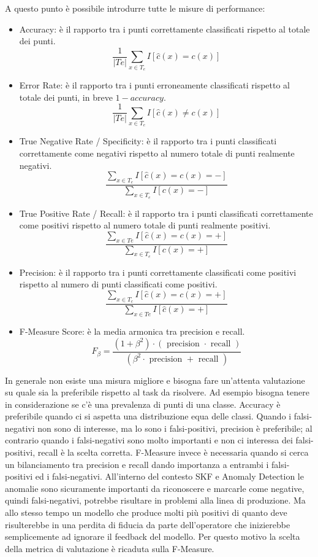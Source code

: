 A questo punto è possibile introdurre tutte le misure di performance:
\begin{itemize}
\item Accuracy: è il rapporto tra i punti correttamente classificati rispetto al totale dei punti.
\[\frac{1}{|Te|} \sum_{x \in T_e} I[\hat{c}(x)=c(x)]\]
\item Error Rate: è il rapporto tra i punti erroneamente classificati rispetto al totale dei punti, in breve \(1-accuracy\).
\[\frac{1}{|Te|} \sum_{x \in T_e} I[\hat{c}(x)\neq c(x)]\]
\item True Negative Rate / Specificity: è il rapporto tra i punti classificati correttamente come negativi rispetto al numero totale di punti realmente negativi.
\[\frac{\sum_{x \in T_e} I[\hat{c}(x)=c(x)=-]}{\sum_{x \in T_e} I[c(x)=-]}\]
\item True Positive Rate / Recall: è il rapporto tra i punti classificati correttamente come positivi rispetto al numero totale di punti realmente positivi.
\[\frac{\sum_{x \in T e} I[\hat{c}(x)=c(x)=+]}{\sum_{x \in T_e} I[c(x)=+]}\]
\item Precision: è il rapporto tra i punti correttamente classificati come positivi rispetto al numero di punti classificati come positivi.
\[\frac{\sum_{x \in T_c} I[\hat{c}(x)=c(x)=+]}{\sum_{x \in T e} I[\hat{c}(x)=+]}\]
\item F-Measure Score: è la media armonica tra precision e recall.
\[F_\beta=\frac{\left(1+\beta^2\right) \cdot(\text { precision } \cdot \text { recall })}{\left(\beta^2 \cdot \text { precision }+\text { recall }\right)}\]
\end{itemize}

In generale non esiste una misura migliore e bisogna fare un'attenta valutazione su quale sia la preferibile rispetto al task da risolvere.
Ad esempio bisogna tenere in considerazione se c'è una prevalenza di punti di una classe. Accuracy è preferibile quando ci si aspetta una distribuzione equa delle classi. Quando i falsi-negativi non sono di interesse, ma lo sono i falsi-positivi, precision è preferibile; al contrario quando i falsi-negativi sono molto importanti e non ci interessa dei falsi-positivi, recall è la scelta corretta.
F-Measure invece è necessaria quando si cerca un bilanciamento tra precision e recall dando importanza a entrambi i falsi-positivi ed i falsi-negativi. 
All'interno del contesto SKF e Anomaly Detection le anomalie sono sicuramente importanti da riconoscere e marcarle come negative, quindi falsi-negativi, potrebbe risultare in problemi alla linea di produzione. Ma allo stesso tempo un modello che produce molti più positivi di quanto deve risulterebbe in una perdita di fiducia da parte dell'operatore che inizierebbe semplicemente ad ignorare il feedback del modello. Per questo motivo la scelta della metrica di valutazione è ricaduta sulla F-Measure.



